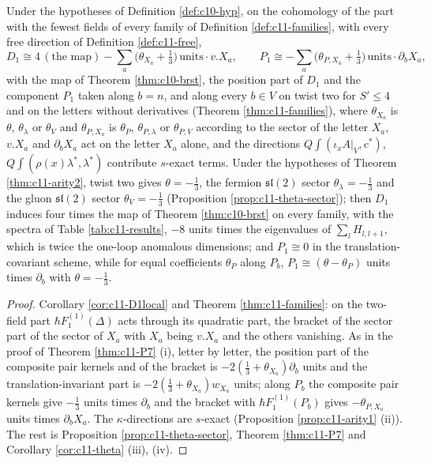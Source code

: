 \begin{corollary}
\label{cor:c11-D1fam}
Under the hypotheses of Definition \ref{def:c10-hyp}, on the cohomology of the part with the fewest fields of every family of Definition \ref{def:c11-families}, with every free direction of Definition \ref{def:c11-free},
\[
D_1\cong4\,(\text{the map})-\sum_a\big(\theta_{X_a}+\tfrac13\big)\,\text{units}\cdot v.X_a,\qquad P_1\cong-\sum_a\big(\theta_{P,X_a}+\tfrac13\big)\,\text{units}\cdot\partial_bX_a,
\]
with the map of Theorem \ref{thm:c10-brst}, the position part of $D_1$ and the component $P_1$ taken along $b=n$, and along every $b\in V$ on twist two for $S'\le4$ and on the letters without derivatives (Theorem \ref{thm:c11-families}), where $\theta_{X_a}$ is $\theta$, $\theta_\lambda$ or $\theta_V$ and $\theta_{P,X_a}$ is $\theta_P$, $\theta_{P,\lambda}$ or $\theta_{P,V}$ according to the sector of the letter $X_a$, $v.X_a$ and $\partial_bX_a$ act on the letter $X_a$ alone, and the directions $Q\int(\iota_xA|_V,c^*)$, $Q\int(\rho(x)\lambda^*,\lambda^*)$ contribute $s$-exact terms. Under the hypotheses of Theorem \ref{thm:c11-arity2}, twist two gives $\theta=-\tfrac13$, the fermion $\mathfrak{sl}(2)$ sector $\theta_\lambda=-\tfrac13$ and the gluon $\mathfrak{sl}(2)$ sector $\theta_V=-\tfrac13$ (Proposition \ref{prop:c11-theta-sector}); then $D_1$ induces four times the map of Theorem \ref{thm:c10-brst} on every family, with the spectra of Table \ref{tab:c11-results}, $-8$ units times the eigenvalues of $\sum_lH_{l,l+1}$, which is twice the one-loop anomalous dimensions; and $P_1\cong0$ in the translation-covariant scheme, while for equal coefficients $\theta_P$ along $P_b$, $P_1\cong(\theta-\theta_P)$ units times $\partial_b$ with $\theta=-\tfrac13$.
\end{corollary}

\begin{proof}
Corollary \ref{cor:c11-D1local} and Theorem \ref{thm:c11-families}: on the two-field part $\hbar F_1^{(1)}(\Delta)$ acts through its quadratic part, the bracket of the sector part of the sector of $X_a$ with $X_a$ being $v.X_a$ and the others vanishing. As in the proof of Theorem \ref{thm:c11-P7} (i), letter by letter, the position part of the composite pair kernels and of the bracket is $-2(\tfrac13+\theta_{X_a})\partial_b$ units and the translation-invariant part is $-2(\tfrac13+\theta_{X_a})w_{X_a}$ units; along $P_b$ the composite pair kernels give $-\tfrac13$ units times $\partial_b$ and the bracket with $\hbar F_1^{(1)}(P_b)$ gives $-\theta_{P,X_a}$ units times $\partial_bX_a$. The $\kappa$-directions are $s$-exact (Proposition \ref{prop:c11-arity1} (ii)). The rest is Proposition \ref{prop:c11-theta-sector}, Theorem \ref{thm:c11-P7} and Corollary \ref{cor:c11-theta} (iii), (iv).
\end{proof}

